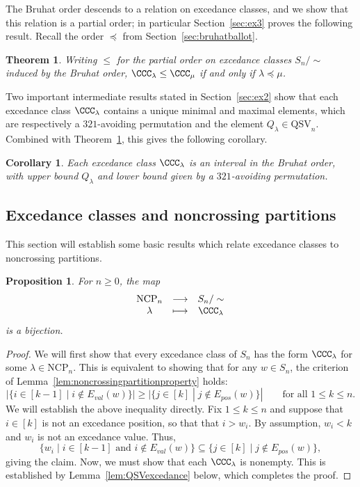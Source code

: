 \documentclass[12pt]{article}
\newtheorem{thm}[equation]{Theorem}
\newtheorem{prop}[equation]{Proposition}
\newtheorem{cor}[equation]{Corollary}
\theoremstyle{definition}
\theoremstyle{remark}
\numberwithin{equation}{section}
\renewcommand{\to}{\longrightarrow}
\renewcommand{\mapsto}{\longmapsto}
\newcommand{\QSV}{\mathrm{QSV}}
\newcommand{\NCP}{\mathrm{NCP}}
\newcommand{\EP}{E_{pos}}
\newcommand{\EV}{E_{val}}
\begin{document}
The Bruhat order descends to a relation on excedance classes, and we show that this relation is a partial order; in particular Section~\ref{sec:ex3} proves the following result.  Recall the order $\preceq$ from Section~\ref{sec:bruhatballot}.

\begin{thm}
\label{thm:excedancequotient}
Writing $\le$ for the partial order on excedance classes $S_{n}/\sim$ induced by the Bruhat order, $\CCC_{\lambda} \le \CCC_{\mu}$ if and only if $\lambda \preceq \mu$.
\end{thm}

Two important intermediate results stated in Section~\ref{sec:ex2} show that each excedance class $\CCC_{\lambda}$ contains a unique minimal and maximal elements, which are respectively a $321$-avoiding permutation and the element $Q_{\lambda} \in \QSV_{n}$.  Combined with Theorem~\ref{thm:excedancequotient}, this gives the following corollary.  

\begin{cor}
Each excedance class $\CCC_{\lambda}$ is an interval in the Bruhat order, with upper bound $Q_{\lambda}$ and lower bound given by a $321$-avoiding permutation.
\end{cor}

\subsection{Excedance classes and noncrossing partitions}
\label{sec:ex1}

This section will establish some basic results which relate excedance classes to noncrossing partitions.  

\begin{prop}
For $n \ge 0$, the map
\[
\begin{array}{ccc}
\NCP_{n} & \to & S_{n}/\sim \\
\lambda & \mapsto & \CCC_{\lambda}
\end{array}
\]
is a bijection.
\end{prop}
\begin{proof}
We will first show that every excedance class of $S_{n}$ has the form $\CCC_{\lambda}$ for some $\lambda \in \NCP_{n}$.  
This is equivalent to showing that for any $w \in S_{n}$, the criterion of Lemma~\ref{lem:noncrossingpartitionproperty} holds:
\[
|\{i \in [k-1] \;|\; i \notin \EV(w)\}| \ge |\{ j \in [k] \;|\; j \notin \EP(w)\}| \qquad\text{for all $1 \le k \le n$}.
\]
We will establish the above inequality directly.  Fix $1 \le k \le n$ and suppose that $i \in [k]$ is not an excedance position, so that that $i > w_{i}$.  By assumption, $w_{i} < k$ and $w_{i}$ is not an excedance value.  Thus, 
\[
\{w_{i} \;|\; \text{$i \in [k-1]$ and $i \notin \EV(w)$} \} \subseteq \{j \in [k] \;|\; j \notin \EP(w)\},
\]
giving the claim.  Now, we must show that each $\CCC_{\lambda}$ is nonempty.  This is established by Lemma~\ref{lem:QSVexcedance} below, which completes the proof.
\end{proof}
\end{document}
